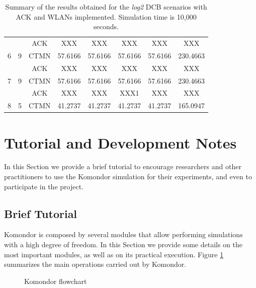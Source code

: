 \documentclass[a4paper]{article}
\begin{document}
\begin{table}[h!]
\begin{tabular}{|c|c|c|c|c|c|c|c|}
		                                            &                                              & ACK       & XXX    &XXX    & XXX    & XXX    & XXX   \\ \cline{3-8} 
		\multirow{-2}{*}{6}                         & \multirow{-2}{*}{9}                          & CTMN          & 57.6166    & 57.6166    & 57.6166    & 57.6166    & 230.4663   \\ \hline
		                                            &                                              & ACK       & XXX    & XXX    & XXX    & XXX    & XXX   \\ \cline{3-8} 
		\multirow{-2}{*}{7}                         & \multirow{-2}{*}{9}                          & CTMN          & 57.6166    & 57.6166    & 57.6166    & 57.6166    & 230.4663   \\ \hline
		                                            &                                              & ACK       & XXX   & XXX    &XXX1    & XXX   &XXX   \\ \cline{3-8} 
		\multirow{-2}{*}{8}                         & \multirow{-2}{*}{5}                          & CTMN          & 41.2737    & 41.2737    & 41.2737    & 41.2737    & 165.0947   \\ \hline
		\end{tabular}
		\caption{Summary of the results obtained for the \textit{log2} DCB scenarios with ACK and WLANs implemented. Simulation time is 10,000 seconds.}
		\label{table:scenario_4wlans}
	\end{table}
	
\section{Tutorial and Development Notes}
\label{section:tutorial_and_development_notes}
	In this Section we provide a brief tutorial to encourage researchers and other practitioners to use the Komondor simulation for their experiments, and even to participate in the project. 
	\subsection{Brief Tutorial}
	\label{section:brief_tutorial}
		Komondor is composed by several modules that allow performing simulations with a high degree of freedom. In this Section we provide some details on the most important modules, as well as on its practical execution. Figure \ref{fig:komondor_flowchart} summarizes the main operations carried out by Komondor.
		\begin{figure}[h!]
			\centering
			\caption{Komondor flowchart}
			\label{fig:komondor_flowchart}
		\end{figure}		
		
\end{document}
